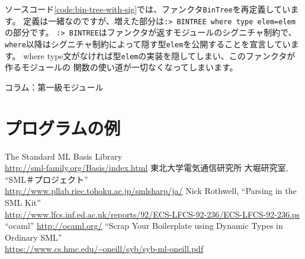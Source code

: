 \documentclass[11pt,a4paper]{article}
\begin{document}
ソースコード\ref{code:bin-tree-with-sig}では、ファンクタ\lstinline{BinTree}を再定義しています。
定義は一緒なのですが、増えた部分は\lstinline{:> BINTREE where type elem=elem}の部分です。
\lstinline{:> BINTREE}はファンクタが返すモジュールのシグニチャ制約で、
\lstinline{where}以降はシグニチャ制約によって隠す型\lstinline{elem}を公開することを宣言しています。
where type文がなければ型\lstinline{elem}の実装を隠してしまい、このファンクタが作るモジュールの
関数の使い道が一切なくなってしまいます。

\begin{itembox}[l]{コラム：第一級モジュール}
\end{itembox}

\part{プログラムの例}

\begin{thebibliography}{9}
   The Standard ML Basis Library \\
    \url{http://sml-family.org/Basis/index.html}
   東北大学電気通信研究所 大堀研究室, ``SML＃プロジェクト''\\
    \url{http://www.pllab.riec.tohoku.ac.jp/smlsharp/ja/}
   Nick Rothwell, ``Parsing in the SML Kit'' \\
    \url{http://www.lfcs.inf.ed.ac.uk/reports/92/ECS-LFCS-92-236/ECS-LFCS-92-236.ps}
   ``ocaml''
    \url{http://ocaml.org/}
   ``Scrap Your Boilerplate using Dynamic Types in Ordinary SML'' \\
    \url{https://www.cs.hmc.edu/~oneill/syb/syb-ml-oneill.pdf}
\end{thebibliography}
\end{document}

